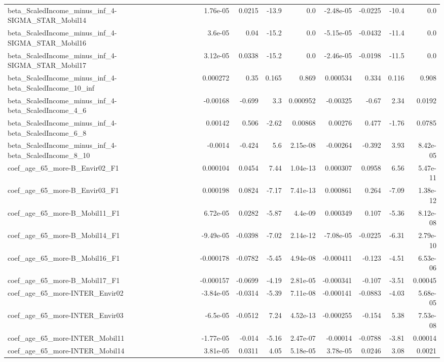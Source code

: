 \begin{tabular}{lrrrrrrrr}
beta_ScaledIncome_minus_inf_4-SIGMA_STAR_Mobil14 & 1.76e-05 & 0.0215 & -13.9 & 0.0 & -2.48e-05 & -0.0225 & -10.4 & 0.0 \\
beta_ScaledIncome_minus_inf_4-SIGMA_STAR_Mobil16 & 3.6e-05 & 0.04 & -15.2 & 0.0 & -5.15e-05 & -0.0432 & -11.4 & 0.0 \\
beta_ScaledIncome_minus_inf_4-SIGMA_STAR_Mobil17 & 3.12e-05 & 0.0338 & -15.2 & 0.0 & -2.46e-05 & -0.0198 & -11.5 & 0.0 \\
beta_ScaledIncome_minus_inf_4-beta_ScaledIncome_10_inf & 0.000272 & 0.35 & 0.165 & 0.869 & 0.000534 & 0.334 & 0.116 & 0.908 \\
beta_ScaledIncome_minus_inf_4-beta_ScaledIncome_4_6 & -0.00168 & -0.699 & 3.3 & 0.000952 & -0.00325 & -0.67 & 2.34 & 0.0192 \\
beta_ScaledIncome_minus_inf_4-beta_ScaledIncome_6_8 & 0.00142 & 0.506 & -2.62 & 0.00868 & 0.00276 & 0.477 & -1.76 & 0.0785 \\
beta_ScaledIncome_minus_inf_4-beta_ScaledIncome_8_10 & -0.0014 & -0.424 & 5.6 & 2.15e-08 & -0.00264 & -0.392 & 3.93 & 8.42e-05 \\
coef_age_65_more-B_Envir02_F1 & 0.000104 & 0.0454 & 7.44 & 1.04e-13 & 0.000307 & 0.0958 & 6.56 & 5.47e-11 \\
coef_age_65_more-B_Envir03_F1 & 0.000198 & 0.0824 & -7.17 & 7.41e-13 & 0.000861 & 0.264 & -7.09 & 1.38e-12 \\
coef_age_65_more-B_Mobil11_F1 & 6.72e-05 & 0.0282 & -5.87 & 4.4e-09 & 0.000349 & 0.107 & -5.36 & 8.12e-08 \\
coef_age_65_more-B_Mobil14_F1 & -9.49e-05 & -0.0398 & -7.02 & 2.14e-12 & -7.08e-05 & -0.0225 & -6.31 & 2.79e-10 \\
coef_age_65_more-B_Mobil16_F1 & -0.000178 & -0.0782 & -5.45 & 4.94e-08 & -0.000411 & -0.123 & -4.51 & 6.53e-06 \\
coef_age_65_more-B_Mobil17_F1 & -0.000157 & -0.0699 & -4.19 & 2.81e-05 & -0.000341 & -0.107 & -3.51 & 0.00045 \\
coef_age_65_more-INTER_Envir02 & -3.84e-05 & -0.0314 & -5.39 & 7.11e-08 & -0.000141 & -0.0883 & -4.03 & 5.68e-05 \\
coef_age_65_more-INTER_Envir03 & -6.5e-05 & -0.0512 & 7.24 & 4.52e-13 & -0.000255 & -0.154 & 5.38 & 7.53e-08 \\
coef_age_65_more-INTER_Mobil11 & -1.77e-05 & -0.014 & -5.16 & 2.47e-07 & -0.00014 & -0.0788 & -3.81 & 0.00014 \\
coef_age_65_more-INTER_Mobil14 & 3.81e-05 & 0.0311 & 4.05 & 5.18e-05 & 3.78e-05 & 0.0246 & 3.08 & 0.0021 \\

\end{tabular}
